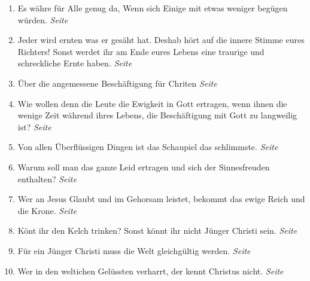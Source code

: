 \begin{enumerate}
 \item Es währe für Alle genug da, Wenn sich Einige mit etwas weniger begügen
würden.
 \dotfill \textit{Seite \pageref{ref:15_02_genug_fuer_alle}}\\

 \item Jeder wird ernten was er gesäht hat. Deshab hört auf die innere Stimme
eures Richters! Sonst werdet ihr am Ende eures Lebens eine traurige und
schreckliche Ernte haben.
 \dotfill \textit{Seite \pageref{ref:15_04_innere_stimme}}\\

 \item Über die angemessene Beschäftigung für Chriten
 \dotfill \textit{Seite \pageref{ref:15_05_freizeitbeschaeftigung}}\\

 \item Wie wollen denn die Leute die Ewigkeit in Gott ertragen, wenn ihnen die
wenige Zeit während ihres Lebens, die Beschäftigung mit Gott zu langweilig ist?
 \dotfill \textit{Seite \pageref{ref:15_06_langeweile}}\\

 \item Von allen Überflüssigen Dingen ist das Schaupiel das schlimmste.
 \dotfill \textit{Seite \pageref{ref:15_08_schauspiel}}\\

 \item Warum soll man das ganze Leid ertragen und sich der Sinnesfreuden
enthalten?
 \dotfill \textit{Seite \pageref{ref:16_01_warum}}\\

 \item Wer an Jesus Glaubt und im Gehorsam leistet, bekommt das ewige Reich und
die Krone.
 \dotfill \textit{Seite \pageref{ref:16_01_warum_2}}\\

 \item Könt ihr den Kelch trinken? Sonst könnt ihr nicht Jünger Christi sein.
 \dotfill \textit{Seite \pageref{ref:16_03_kelch_tringen}}\\

 \item Für ein Jünger Christi muss die Welt gleichgültig werden.
 \dotfill \textit{Seite \pageref{ref:16_05_weltliches}}\\

 \item Wer in den weltichen Gelüssten verharrt, der kennt Christus nicht.
 \dotfill \textit{Seite \pageref{ref:16_05_weltliches_2}}\\


\end{enumerate}

